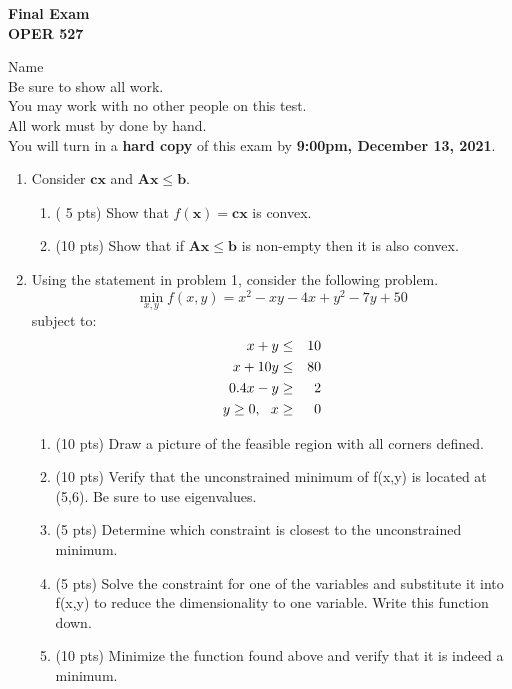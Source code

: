 \documentclass[12pt]{article}
\begin{document}
\begin{center}
{\bf \large{Final Exam} \\
OPER 527}
\end{center}

\vspace{.25in}

\noindent Name \underline{\hspace{7cm}} \\
Be sure to show all work.\\
You may work with no other people on this test.\\
All work must by done by hand.\\
You will turn in a {\bf hard copy} of this exam by {\bf 9:00pm, December 13, 2021}.

\begin{enumerate}
\item  Consider $\mathbf{cx}$ and $\mathbf{Ax} \le \mathbf{b}$.
\begin{enumerate}
  \item ( 5 pts)  Show that $f(\mathbf{x})=\mathbf{cx}$ is convex.
  \item (10 pts)  Show that if $\mathbf{Ax} \le \mathbf{b}$ is non-empty then it is also convex. 
\end{enumerate}

\pagebreak
\item Using the statement in problem 1, consider the following problem.
\[ \min_{x,y} f(x,y) = x^2 - xy - 4x + y^2 - 7y + 50 \]
subject to:
\begin{eqnarray*}
x + y &\le& 10 \cr
x + 10y &\le& 80  \cr
0.4x - y &\ge& 2 \cr
y \ge 0 , ~~ x &\ge& 0 
\end{eqnarray*}
\begin{enumerate}
  \item (10 pts) Draw a picture of the feasible region with all corners defined.
  \item (10 pts) Verify that the unconstrained minimum of f(x,y) is located at (5,6).  Be sure to use eigenvalues.
  \item (5 pts) Determine which constraint is closest to the unconstrained minimum.
  \item (5 pts) Solve the constraint for one of the variables and substitute it into f(x,y) to reduce the dimensionality to one variable.  Write this function down.
  \item (10 pts) Minimize the function found above and verify that it is indeed a minimum.
   
\end{enumerate}


\end{enumerate}
\end{document}
